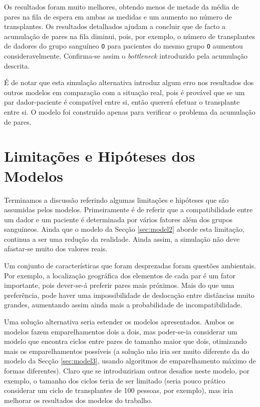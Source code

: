 \documentclass[10pt,a4paper,oneside]{article}
\begin{document}
Os resultados foram muito melhores, obtendo menos de metade da média
de pares na fila de espera em ambas as medidas e um aumento no número
de transplantes. Os resultados detalhados ajudam a concluir que de
facto a acumulação de pares na fila diminui, pois, por exemplo, o
número de transplantes de dadores do grupo sanguíneo \texttt{O} para
pacientes do mesmo grupo \texttt{O} aumentou
consideravelmente. Confirma-se assim o \textit{bottleneck} introduzido
pela acumulação descrita.

É de notar que esta simulação alternativa introduz algum erro nos
resultados dos outros modelos em comparação com a situação real, pois
é provável que se um par dador-paciente é compatível entre si, então
quererá efetuar o transplante entre si. O modelo foi construído apenas
para verificar o problema da acumulação de pares.


\section{Limitações e Hipóteses dos Modelos}
\label{sec:limits}

Terminamos a discussão referindo algumas limitações e hipóteses que
são assumidas pelos modelos. Primeiramente é de referir que a
compatibilidade entre um dador e um paciente é determinada por vários
fatores além dos grupos sanguíneos. Ainda que o modelo da Secção
\ref{sec:model2} aborde esta limitação, continua a ser uma redução da
realidade. Ainda assim, a simulação não deve afastar-se muito dos
valores reais.

Um conjunto de características que foram desprezadas foram questões
ambientais. Por exemplo, a localização geográfica dos elementos de
cada par é um fator importante, pois dever-se-á preferir pares mais
próximos. Mais do que uma preferência, pode haver uma impossibilidade
de deslocação entre distâncias muito grandes, aumentando assim ainda
mais a probabilidade de incompatibilidade.

Uma solução alternativa seria estender os modelos apresentados. Ambos
os modelos fazem emparelhamentos dois a dois, mas poder-se-ia
considerar um modelo que encontra ciclos entre pares de tamanho maior
que dois, otimizando mais os emparelhamentos possíveis (a solução não
iria ser muito diferente da do modelo da Secção \ref{sec:model3},
usando algoritmos de emparelhamento máximo de formas
diferentes). Claro que se introduziriam outros desafios neste modelo,
por exemplo, o tamanho dos ciclos teria de ser limitado (seria pouco
prático considerar um ciclo de transplantes de 100 pessoas, por
exemplo), mas iria melhorar os resultados dos modelos do trabalho.
\end{document}
